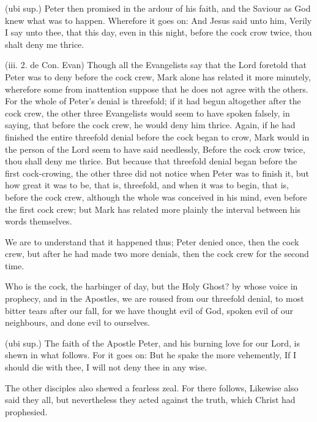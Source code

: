  (ubi sup.) Peter then promised in the ardour of his faith, and the Saviour as God knew what was to happen. Wherefore it goes on: And Jesus said unto him, Verily I say unto thee, that this day, even in this night, before the cock crow twice, thou shalt deny me thrice.

 (iii. 2. de Con. Evan) Though all the Evangelists say that the Lord foretold that Peter was to deny before the cock crew, Mark alone has related it more minutely, wherefore some from inattention suppose that he does not agree with the others. For the whole of Peter’s denial is threefold; if it had begun altogether after the cock crew, the other three Evangelists would seem to have spoken falsely, in saying, that before the cock crew, he would deny him thrice. Again, if he had finished the entire threefold denial before the cock began to crow, Mark would in the person of the Lord seem to have said needlessly, Before the cock crow twice, thou shall deny me thrice. But because that threefold denial began before the first cock-crowing, the other three did not notice when Peter was to finish it, but how great it was to be, that is, threefold, and when it was to begin, that is, before the cock crew, although the whole was conceived in his mind, even before the first cock crew; but Mark has related more plainly the interval between his words themselves.

 We are to understand that it happened thus; Peter denied once, then the cock crew, but after he had made two more denials, then the cock crew for the second time.

 Who is the cock, the harbinger of day, but the Holy Ghost? by whose voice in prophecy, and in the Apostles, we are roused from our threefold denial, to most bitter tears after our fall, for we have thought evil of God, spoken evil of our neighbours, and done evil to ourselves.

 (ubi sup.) The faith of the Apostle Peter, and his burning love for our Lord, is shewn in what follows. For it goes on: But he spake the more vehemently, If I should die with thee, I will not deny thee in any wise.

 The other disciples also shewed a fearless zeal. For there follows, Likewise also said they all, but nevertheless they acted against the truth, which Christ had prophesied.

